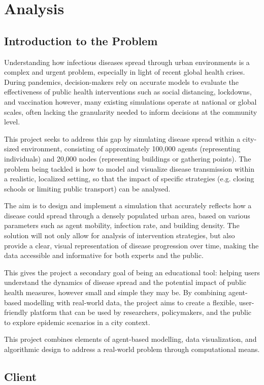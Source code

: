 \chapter{Analysis}
\section{Introduction to the Problem}
Understanding how infectious diseases spread through urban environments is a complex and urgent problem, especially in light of recent global health crises. During pandemics, decision-makers rely on accurate models to evaluate the effectiveness of public health interventions such as social distancing, lockdowns, and vaccination however, many existing simulations operate at national or global scales, often lacking the granularity needed to inform decisions at the community level.

This project seeks to address this gap by simulating disease spread within a city-sized environment, consisting of approximately 100,000 agents (representing individuals) and 20,000 nodes (representing buildings or gathering points). The problem being tackled is how to model and visualize disease transmission within a realistic, localized setting, so that the impact of specific strategies (e.g. closing schools or limiting public transport) can be analysed.

The aim is to design and implement a simulation that accurately reflects how a disease could spread through a densely populated urban area, based on various parameters such as agent mobility, infection rate, and building density. The solution will not only allow for analysis of intervention strategies, but also provide a clear, visual representation of disease progression over time, making the data accessible and informative for both experts and the public.

This gives the project a secondary goal of being an educational tool: helping users understand the dynamics of disease spread and the potential impact of public health measures, however small and simple they may be. By combining agent-based modelling with real-world data, the project aims to create a flexible, user-friendly platform that can be used by researchers, policymakers, and the public to explore epidemic scenarios in a city context.

This project combines elements of agent-based modelling, data visualization, and algorithmic design to address a real-world problem through computational means.

\section{Client}
